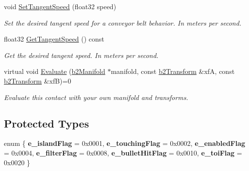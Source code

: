 \begin{DoxyCompactItemize}
\mbox{\label{classb2Contact_a32033914a6c7f35b469e8fddbc17c566}} 
void \mbox{\hyperlink{classb2Contact_a32033914a6c7f35b469e8fddbc17c566}{Set\+Tangent\+Speed}} (float32 speed)
\begin{DoxyCompactList}\small\item\em Set the desired tangent speed for a conveyor belt behavior. In meters per second. \end{DoxyCompactList}\item 
\mbox{\label{classb2Contact_a927125db0b36947a3bb53c4e3eded1cd}} 
float32 \mbox{\hyperlink{classb2Contact_a927125db0b36947a3bb53c4e3eded1cd}{Get\+Tangent\+Speed}} () const
\begin{DoxyCompactList}\small\item\em Get the desired tangent speed. In meters per second. \end{DoxyCompactList}\item 
\mbox{\label{classb2Contact_ae3c2842e5325b2d4500f8ed1d4de2f72}} 
virtual void \mbox{\hyperlink{classb2Contact_ae3c2842e5325b2d4500f8ed1d4de2f72}{Evaluate}} (\mbox{\hyperlink{structb2Manifold}{b2\+Manifold}} $\ast$manifold, const \mbox{\hyperlink{structb2Transform}{b2\+Transform}} \&xfA, const \mbox{\hyperlink{structb2Transform}{b2\+Transform}} \&xfB)=0
\begin{DoxyCompactList}\small\item\em Evaluate this contact with your own manifold and transforms. \end{DoxyCompactList}\end{DoxyCompactItemize}
\subsection*{Protected Types}
\begin{DoxyCompactItemize}
\item 
\mbox{\label{classb2Contact_ab8f00a9c04b3eea54a9c5bab29328c3e}} 
enum \{ \newline
{\bfseries e\+\_\+island\+Flag} = 0x0001, 
{\bfseries e\+\_\+touching\+Flag} = 0x0002, 
{\bfseries e\+\_\+enabled\+Flag} = 0x0004, 
{\bfseries e\+\_\+filter\+Flag} = 0x0008, 
\newline
{\bfseries e\+\_\+bullet\+Hit\+Flag} = 0x0010, 
{\bfseries e\+\_\+toi\+Flag} = 0x0020
 \}
\end{DoxyCompactItemize}
